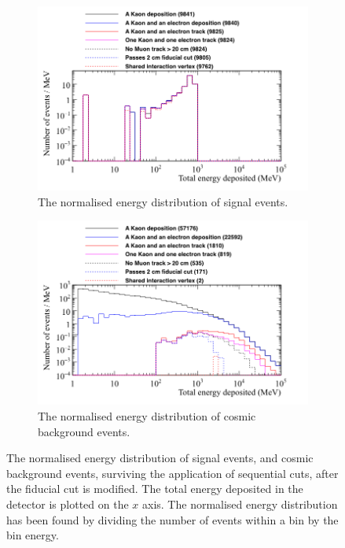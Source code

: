 \begin{figure}[h!]
  \centering
  \begin{subfigure}{0.8\textwidth}
    \includegraphics[width=\textwidth]{NucleonDecay_EnergyDepCuts_Norm}
    \caption{The normalised energy distribution of signal events.}
    \label{fig:NDK_FidCut_EnLim_Sig}
  \end{subfigure}
  \begin{subfigure}{0.8\textwidth}
    \includegraphics[width=\textwidth]{CosmicBackground_EnergyDepCuts_Norm}
    \caption{The normalised energy distribution of cosmic background events.}
    \label{fig:NDK_FidCut_EnLim_Cosmo}
  \end{subfigure}
  \caption[The normalised energy distribution of signal events, and cosmic background events, surviving the application of sequential cuts, after the fiducial cut is modified]
          {The normalised energy distribution of signal events, and cosmic background events, surviving the application of sequential cuts, after the fiducial cut is modified. The total energy deposited in the detector is plotted on the $x$ axis. The normalised energy distribution has been found by dividing the number of events within a bin by the bin energy.}
  \label{fig:NDK_FidCut_EnLim}
\end{figure}

